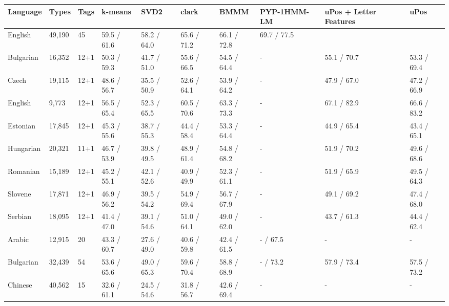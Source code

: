 \begin{table}
  \begin{tabular}{|l|l|l|l|l|l|l|l|l|l|}
        \hline
        Language   & Types   & Tags & k-means      & SVD2         & clark        & BMMM         & PYP-1HMM-LM & uPos + Letter Features & uPos     \\ \hline
        English    & 49,190  & 45   & 59.5 / 61.6   & 58.2 / 64.0   & 65.6 / 71.2   & 66.1 / 72.8   & 69.7 / 77.5 & ~               & ~           \\ \hline
        Bulgarian  & 16,352  & 12+1 & 50.3 / 59.3   & 41.7 / 51.0   & 55.6 / 66.5   & 54.5 / 64.4   & -           & 55.1 / 70.7     & 53.3 / 69.4 \\ \hline
        Czech      & 19,115  & 12+1 & 48.6 / 56.7   & 35.5 / 50.9   & 52.6 / 64.1   & 53.9 / 64.2   & -           & 47.9 / 67.0     & 47.2 / 66.9 \\ \hline
        English    & 9,773   & 12+1 & 56.5 / 65.4   & 52.3 / 65.5   & 60.5 / 70.6   & 63.3 / 73.3   & -           & 67.1 / 82.9     & 66.6 / 83.2 \\ \hline
        Estonian   & 17,845  & 12+1 & 45.3 / 55.6   & 38.7 / 55.3   & 44.4 / 58.4   & 53.3 / 64.4   & -           & 44.9 / 65.4     & 43.4 / 65.1 \\ \hline
        Hungarian  & 20,321  & 11+1 & 46.7 / 53.9   & 39.8 / 49.5   & 48.9 / 61.4   & 54.8 / 68.2   & -           & 51.9 / 70.2     & 49.6 / 68.6 \\ \hline
        Romanian   & 15,189  & 12+1 & 45.2 / 55.1   & 42.1 / 52.6   & 40.9 / 49.9   & 52.3 / 61.1   & -           & 51.9 / 65.9     & 49.5 / 64.3 \\ \hline
        Slovene    & 17,871  & 12+1 & 46.9 / 56.2   & 39.5 / 54.2   & 54.9 / 69.4   & 56.7 / 67.9   & -           & 49.1 / 69.2     & 47.4 / 68.0 \\ \hline
        Serbian    & 18,095  & 12+1 & 41.4 / 47.0   & 39.1 / 54.6   & 51.0 / 64.1   & 49.0 / 62.0   & -           & 43.7 / 61.3     & 44.4 / 62.4 \\ \hline
        Arabic     & 12,915  & 20   & 43.3 / 60.7   & 27.6 / 49.0   & 40.6 / 59.8   & 42.4 / 61.5   & - / 67.5    & -               & -           \\ \hline
        Bulgarian  & 32,439  & 54   & 53.6 / 65.6   & 49.0 / 65.3   & 59.6 / 70.4   & 58.8 / 68.9   & - / 73.2    & 57.9 / 73.4     & 57.5 / 73.2 \\ \hline
        Chinese    & 40,562  & 15   & 32.6 / 61.1   & 24.5 / 54.6   & 31.8 / 56.7   & 42.6 / 69.4   & -           & -               & -           \\ \hline

\end{tabular}
\end{table}
